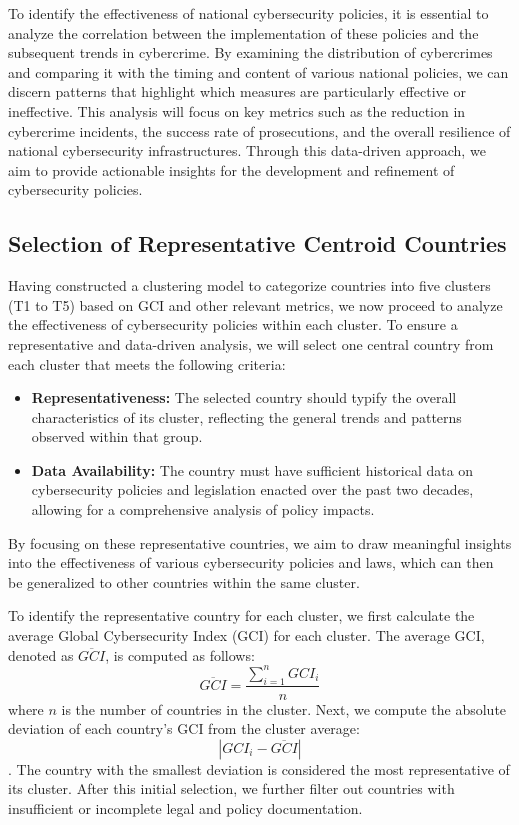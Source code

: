 To identify the effectiveness of national cybersecurity policies,
it is essential to analyze the correlation between the implementation of these policies and the subsequent trends in cybercrime.
By examining the distribution of cybercrimes and comparing it with the timing and content of various national policies,
we can discern patterns that highlight which measures are particularly effective or ineffective.
This analysis will focus on key metrics such as the reduction in
cybercrime incidents, the success rate of prosecutions, and the overall resilience of national cybersecurity infrastructures.
Through this data-driven approach,
we aim to provide actionable insights for the development and refinement of cybersecurity policies.
\subsection{Selection of Representative Centroid Countries}\label{subsec:selection-of-representative centroid-countries} %
Having constructed a clustering model to categorize countries into five clusters (T1 to T5) based on GCI and other relevant metrics,
we now proceed to analyze the effectiveness of cybersecurity policies within each cluster.
To ensure a representative and data-driven analysis,
we will select one central country from each cluster that meets the following criteria:
\begin{itemize}
    \item \textbf{Representativeness:}
    The selected country should typify the overall characteristics of its cluster,
    reflecting the general trends and patterns observed within that group.
    \item \textbf{Data Availability:}
    The country must have sufficient historical data on cybersecurity policies and legislation enacted over the past two decades,
    allowing for a comprehensive analysis of policy impacts.
\end{itemize}
By focusing on these representative countries,
we aim to draw meaningful insights into the effectiveness of various cybersecurity policies and laws,
which can then be generalized to other countries within the same cluster.

To identify the representative country for each cluster,
we first calculate the average Global Cybersecurity Index (GCI) for each cluster.
The average GCI, denoted as \(\overline{GCI}\), is computed as follows:
\[ \overline{GCI} = \frac{\sum_{i=1}^{n} GCI_i}{n} \]
where \(n\) is the number of countries in the cluster.
Next, we compute the absolute deviation of each country's GCI from the cluster average:
\[|GCI_i - \overline{GCI}|\] .
The country with the smallest deviation is considered the most representative of its cluster.
After this initial selection, we further filter out countries with insufficient or incomplete legal and policy documentation.

